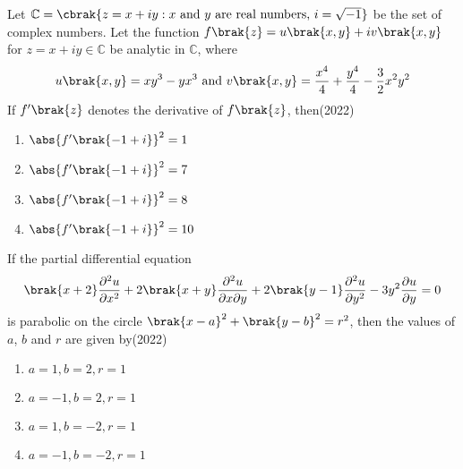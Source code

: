 \item Let $\mathbb{C}=\cbrak{z=x+iy:x\text{ and }y\text{ are real numbers, }i=\sqrt{-1}}$ be the set of complex numbers. Let the function $f\brak{z}=u\brak{x,y}+iv\brak{x,y}$ for $z=x+iy\in\mathbb{C}$ be analytic in $\mathbb{C}$, where $$u\brak{x,y}=xy^{3}-yx^{3}\text{ and }v\brak{x,y}=\frac{x^{4}}{4}+\frac{y^{4}}{4}-\frac{3}{2}x^{2}y^{2}$$ If $f^{\prime}\brak{z}$ denotes the derivative of $f\brak{z}$, then\hfill(2022)
\begin{multicols}{2}
\begin{enumerate}
\item $\abs{f^{\prime}\brak{-1+i}}^{2}=1$
\item $\abs{f^{\prime}\brak{-1+i}}^{2}=7$
\item $\abs{f^{\prime}\brak{-1+i}}^{2}=8$
\item $\abs{f^{\prime}\brak{-1+i}}^{2}=10$
\end{enumerate}
\end{multicols}


\item If the partial differential equation $$\brak{x+2}\frac{\partial^{2}u}{\partial x^{2}}+2\brak{x+y}\frac{\partial^{2}u}{\partial x\partial y}+2\brak{y-1}\frac{\partial^{2}u}{\partial y^{2}}-3y^{2}\frac{\partial u}{\partial y}=0$$ is parabolic on the circle $\brak{x-a}^{2}+\brak{y-b}^{2}=r^{2}$, then the values of $a$, $b$ and $r$ are given by\hfill(2022)
\begin{multicols}{2}
\begin{enumerate}
\item $a=1,b=2,r=1$
\item $a=-1,b=2,r=1$
\item $a=1,b=-2,r=1$
\item $a=-1,b=-2,r=1$
\end{enumerate}
\end{multicols}